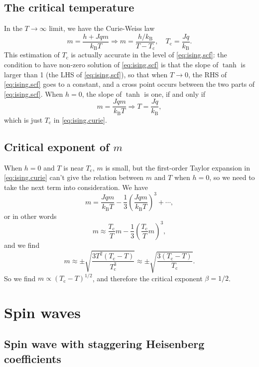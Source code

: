 \documentclass[hyperref, a4paper]{article}
\newcommand*{\Tc}{T_{\text{c}}}
\newcommand*{\kB}{k_{\text{B}}}
\begin{document}
\subsection{The critical temperature}

In the $T \to \infty$ limit, we have the Curie-Weiss law 
\begin{equation}
    m = \frac{h + Jqm}{\kB T} \Rightarrow 
    m = \frac{h / \kB}{T - \Tc}, \quad 
    \Tc = \frac{Jq}{\kB}.
    \label{eq:ising.curie}
\end{equation}
This estimation of $\Tc$ is actually accurate in the level of \eqref{eq:ising.scf}: 
the condition to have non-zero solution of \eqref{eq:ising.scf} 
is that the slope of $\tanh$ is larger than 1 (the LHS of \eqref{eq:ising.scf}), 
so that when $T \to 0$, 
the RHS of \eqref{eq:ising.scf} goes to a constant, 
and a cross point occurs between the two parts of \eqref{eq:ising.scf}.
When $h = 0$, the slope of $\tanh$ is one, if and only if 
\[
    m = \frac{J q m}{\kB T} \Rightarrow T = \frac{J q}{\kB},
\]
which is just $\Tc$ in \eqref{eq:ising.curie}.

\subsection{Critical exponent of $m$}

When $h = 0$ and $T$ is near $\Tc$, 
$m$ is small,
but the first-order Taylor expansion in \eqref{eq:ising.curie} 
can't give the relation between $m$ and $T$ when $h = 0$, 
so we need to take the next term into consideration. 
We have 
\[
    m = \frac{J q m}{\kB T} - \frac{1}{3} \left(
        \frac{J q m}{\kB T}
    \right)^3 + \cdots, 
\]
or in other words 
\[
    m \approx \frac{\Tc}{T} m - \frac{1}{3} \left(
        \frac{\Tc}{T} m
    \right)^3,
\]
and we find 
\begin{equation}
    m \approx \pm \sqrt{
        \frac{3 T^2 (\Tc - T)}{\Tc^3} 
    } \approx \pm \sqrt{
        \frac{3 (\Tc - T)}{\Tc} 
    }.
\end{equation}
So we find $m \propto (\Tc - T)^{1/2}$, 
and therefore the critical exponent $\beta = 1/2$.

\section{Spin waves}

\subsection{Spin wave with staggering Heisenberg coefficients}
\end{document}
